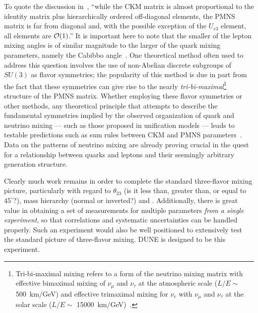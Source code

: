 To quote the discussion in~\cite{deGouvea:2013onf}, ``while the CKM
matrix is almost proportional to the identity matrix plus
hierarchically ordered off-diagonal elements, the PMNS matrix is far
from diagonal and, with the possible exception of the $U_{e3}$
element, all elements are ${\cal O}(1)$.''
It is important here to note that the smaller of the lepton
mixing angles is of similar magnitude to the larger of the quark mixing parameters, namely the Cabibbo angle~\cite{Boucenna:2012xb}.
One theoretical method often used to address this question involves the use of non-Abelian discrete
subgroups of $SU(3)$ as flavor symmetries; the popularity of this method %
is due in part from
the fact that these symmetries can give rise to the nearly \emph{tri-bi-maximal}\footnote{Tri-bi-maximal mixing refers to a form of the neutrino mixing matrix with effective bimaximal mixing of $\nu_\mu$ and $\nu_\tau$
at the atmospheric scale ($L/E \sim$ \SI{500}{\km / \GeV}) and effective trimaximal
mixing for $\nu_e$ with $\nu_\mu$ and $\nu_\tau$ 
at the solar scale ($L/E \sim$ \SI{15000}{\km / \GeV})~\cite{Harrison:2002er}.} 
structure of the PMNS matrix.
Whether employing these flavor symmetries or other methods,
any theoretical principle that attempts to describe the fundamental
symmetries implied by the observed organization of quark and neutrino
mixing --- such as those proposed in unification models --- leads to
testable predictions such as sum rules between CKM and PMNS
parameters~\cite{King:2014nza,deGouvea:2013onf,Mohapatra:2005wg,Albright:2006cw}.
Data on the patterns of neutrino mixing 
are already proving crucial in the quest for a 
relationship between quarks and leptons and their seemingly arbitrary generation
structure.  

Clearly much work remains in order to complete the standard three-flavor 
mixing picture, particularly 
with regard to $\theta_{23}$ (is it less than, greater than, or equal
to $45^\circ$?), mass hierarchy (normal or inverted?) 
and \deltacp.
Additionally, there is 
great value in obtaining a set of measurements for multiple parameters 
\emph{from a single experiment}, so that correlations and systematic 
uncertainties can be handled properly.  Such an experiment would also be 
well positioned to extensively test the standard picture of three-flavor mixing.  
DUNE is designed to be this experiment.

